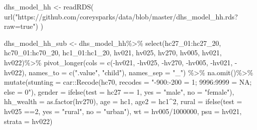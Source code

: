 \documentclass[
  letterpaper,
  DIV=11,
  numbers=noendperiod]{scrreprt}
\newenvironment{Shaded}{\begin{snugshade}}{\end{snugshade}}
\newcommand{\AttributeTok}[1]{\textcolor[rgb]{0.40,0.45,0.13}{#1}}
\newcommand{\DecValTok}[1]{\textcolor[rgb]{0.68,0.00,0.00}{#1}}
\newcommand{\FunctionTok}[1]{\textcolor[rgb]{0.28,0.35,0.67}{#1}}
\newcommand{\NormalTok}[1]{\textcolor[rgb]{0.00,0.23,0.31}{#1}}
\newcommand{\OtherTok}[1]{\textcolor[rgb]{0.00,0.23,0.31}{#1}}
\newcommand{\SpecialCharTok}[1]{\textcolor[rgb]{0.37,0.37,0.37}{#1}}
\newcommand{\StringTok}[1]{\textcolor[rgb]{0.13,0.47,0.30}{#1}}
\begin{document}
\begin{Shaded}
\begin{Highlighting}[]
\NormalTok{dhs\_model\_hh }\OtherTok{\textless{}{-}} \FunctionTok{readRDS}\NormalTok{(}
  \FunctionTok{url}\NormalTok{(}\StringTok{"https://github.com/coreysparks/data/blob/master/dhs\_model\_hh.rds?raw=true"}\NormalTok{)}
\NormalTok{  )}

\NormalTok{dhs\_model\_hh\_sub }\OtherTok{\textless{}{-}}\NormalTok{ dhs\_model\_hh}\SpecialCharTok{\%\textgreater{}\%}
  \FunctionTok{select}\NormalTok{(hc27\_01}\SpecialCharTok{:}\NormalTok{hc27\_20, }
\NormalTok{         hc70\_01}\SpecialCharTok{:}\NormalTok{hc70\_20, }
\NormalTok{         hc1\_01}\SpecialCharTok{:}\NormalTok{hc1\_20,}
\NormalTok{         hv021, hv025, hv270, hv005, hv021, hv022)}\SpecialCharTok{\%\textgreater{}\%}
  \FunctionTok{pivot\_longer}\NormalTok{(}\AttributeTok{cols =} \FunctionTok{c}\NormalTok{(}\SpecialCharTok{{-}}\NormalTok{hv021, }\SpecialCharTok{{-}}\NormalTok{hv025, }\SpecialCharTok{{-}}\NormalTok{hv270, }\SpecialCharTok{{-}}\NormalTok{hv005, }\SpecialCharTok{{-}}\NormalTok{hv021, }\SpecialCharTok{{-}}\NormalTok{hv022), }
               \AttributeTok{names\_to  =} \FunctionTok{c}\NormalTok{(}\StringTok{".value"}\NormalTok{, }\StringTok{"child"}\NormalTok{),}
               \AttributeTok{names\_sep =} \StringTok{"\_"}\NormalTok{) }\SpecialCharTok{\%\textgreater{}\%}
  \FunctionTok{na.omit}\NormalTok{()}\SpecialCharTok{\%\textgreater{}\%}
  \FunctionTok{mutate}\NormalTok{(}\AttributeTok{stunting =}\NormalTok{ car}\SpecialCharTok{::}\FunctionTok{Recode}\NormalTok{(hc70, }\AttributeTok{recodes =} \StringTok{"{-}900:{-}200 = 1; 9996:9999 = NA; else = 0"}\NormalTok{),}
         \AttributeTok{gender =} \FunctionTok{ifelse}\NormalTok{(}\AttributeTok{test =}\NormalTok{ hc27 }\SpecialCharTok{==} \DecValTok{1}\NormalTok{, }\AttributeTok{yes =} \StringTok{"male"}\NormalTok{, }\AttributeTok{no =} \StringTok{"female"}\NormalTok{),}
         \AttributeTok{hh\_wealth =} \FunctionTok{as.factor}\NormalTok{(hv270),}
         \AttributeTok{age =}\NormalTok{ hc1,}
         \AttributeTok{age2 =}\NormalTok{ hc1}\SpecialCharTok{\^{}}\DecValTok{2}\NormalTok{,}
         \AttributeTok{rural =} \FunctionTok{ifelse}\NormalTok{(}\AttributeTok{test =}\NormalTok{ hv025 }\SpecialCharTok{==}\DecValTok{2}\NormalTok{, }\AttributeTok{yes =} \StringTok{"rural"}\NormalTok{, }\AttributeTok{no =} \StringTok{"urban"}\NormalTok{),}
         \AttributeTok{wt =}\NormalTok{ hv005}\SpecialCharTok{/}\DecValTok{1000000}\NormalTok{,}
         \AttributeTok{psu =}\NormalTok{ hv021,}
         \AttributeTok{strata =}\NormalTok{ hv022)}
\end{Highlighting}
\end{Shaded}
\end{document}
